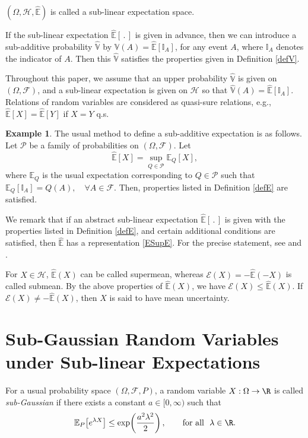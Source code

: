 \documentclass[12pt]{article}
\theoremstyle{definition}
\newtheorem{example}[theorem]{Example}
\theoremstyle{remark}
\numberwithin{equation}{section}
\def\E{{\mathbb {E}}}                       \def\D{{\mathbb {D}}}
\def\I{{\mathbb {I}}}                       \def\M{{\mathbb {M}}}
\def\Eh{{\hat{\mathbb{E}}}}
\def\Vh{{\hat{\mathbb{V}}}}
\def\PD{{\mathcal P}}                     \def\PDW{{\tilde{\cal P}}}
\def\FD{{\mathcal F}}                     \def\GD{{\cal G}}
\def\HD{{\mathcal H}}
\def\ED{{\mathcal E}}
\begin{document}
$(\Omega, \HD, \Eh)$ is called a sub-linear expectation space. 


If the sub-linear expectation $\Eh[\,.\,]$ is given in advance, then 
we can introduce a sub-additive probability $\Vh$
by $\Vh(A) = \Eh [\I_A]$, for any event $A$,  where $\I_A$ denotes the indicator of $A$.
Then this $\Vh$ satisfies the properties given in Definition \ref{defV}.

Throughout this paper, we assume that an upper probability $\Vh$ is given on $(\Omega, \FD)$, 
and a sub-linear expectation is given on $\HD$ so that $\Vh(A) = \Eh [\I_A]$.
Relations of random variables are considered as quasi-sure relations, e.g.,
$\Eh[X]= \Eh[Y]$ if $X=Y$ q.s.

\begin{example} \label{ExmplE}
The usual method to define a sub-additive expectation is as follows.
Let $\PD$ be a family of probabilities on $(\Omega, \FD)$. 
Let
\begin{equation}  \label{ESupE}
\Eh[X] = \sup_{Q \in \PD} \E_Q[X], 
\end{equation}
where $\E_Q$ is the usual expectation corresponding to $Q \in \PD$ such that
$\E_Q[\I_A] = Q(A), \quad \forall A \in \FD$.
Then, properties listed in Definition \ref{defE} are satisfied.
\end{example}

We remark that if an abstract sub-linear expectation $\Eh [\,.\,]$ is given with the properties listed in Definition \ref{defE}, 
and certain additional conditions are satisfied, then $\Eh$ has a representation \eqref{ESupE}.
For the precise statement, see \cite{Delbaen2002} and \cite{Peng2010}.

For $X \in \HD$, $\Eh(X)$ can be called supermean, whereas $\ED(X) = -\Eh(-X)$ is called submean. 
By the above properties of $\Eh(X)$, we have $\ED(X) \le \Eh(X)$. 
If $\ED (X) \ne -\Eh(X)$,
then $X$ is said to have mean uncertainty.






\section{Sub-Gaussian Random Variables under Sub-linear Expectations}
\label{subgauss}
For a usual probability space $(\Omega,\FD,P)$, a random variable
$X:\Omega\to\R$ is called \emph{sub-Gaussian} if there exists a constant
$a\in[0,\infty)$ such that
\begin{equation}  \label{eq:classical_subgaussian}
\E_P\!\left[e^{\lambda X}\right]
\le
\exp\!\left(\frac{a^2\lambda^2}{2}\right),
\qquad \text{for all} \ \ \lambda\in\R.
\end{equation}
\end{document}
